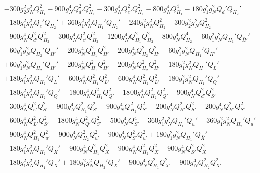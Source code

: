 {\begin{align}
 &-300 g_{2}^{2} g_{N}^{2} Q_{H_1}^{2} -900 g_{N}^{4} Q_{d'}^{2} Q_{H_1}^{2} -300 g_{N}^{4} Q_{e'}^{2} Q_{H_1}^{2} -800 g_{N}^{4} Q_{H_1}^{4} -180 g_{1}^{2} g_{N}^{2} Q_d' Q_{H_2}' \nonumber \\ 
 &-180 g_{1}^{2} g_{N}^{2} Q_e' Q_{H_2}' +360 g_{1}^{2} g_{N}^{2} Q_{H_1}' Q_{H_2}' -240 g_{1}^{2} g_{N}^{2} Q_{H_2}^{2} -300 g_{2}^{2} g_{N}^{2} Q_{H_2}^{2} \nonumber \\ 
 &-900 g_{N}^{4} Q_{d'}^{2} Q_{H_2}^{2} -300 g_{N}^{4} Q_{e'}^{2} Q_{H_2}^{2} -1200 g_{N}^{4} Q_{H_1}^{2} Q_{H_2}^{2} -800 g_{N}^{4} Q_{H_2}^{4} +60 g_{1}^{2} g_{N}^{2} Q_{H_1}' Q_{\bar{H}'}' \nonumber \\ 
 &-60 g_{1}^{2} g_{N}^{2} Q_{H_2}' Q_{\bar{H}'}' -200 g_{N}^{4} Q_{H_1}^{2} Q_{\bar{H}'}^{2} -200 g_{N}^{4} Q_{H_2}^{2} Q_{\bar{H}'}^{2} -60 g_{1}^{2} g_{N}^{2} Q_{H_1}' Q_{H'}' \nonumber \\ 
 &+60 g_{1}^{2} g_{N}^{2} Q_{H_2}' Q_{H'}' -200 g_{N}^{4} Q_{H_1}^{2} Q_{H'}^{2} -200 g_{N}^{4} Q_{H_2}^{2} Q_{H'}^{2} -180 g_{1}^{2} g_{N}^{2} Q_{H_1}' Q_L' \nonumber \\ 
 &+180 g_{1}^{2} g_{N}^{2} Q_{H_2}' Q_L' -600 g_{N}^{4} Q_{H_1}^{2} Q_{L'}^{2} -600 g_{N}^{4} Q_{H_2}^{2} Q_{L'}^{2} +180 g_{1}^{2} g_{N}^{2} Q_{H_1}' Q_Q' \nonumber \\ 
 &-180 g_{1}^{2} g_{N}^{2} Q_{H_2}' Q_Q' -1800 g_{N}^{4} Q_{H_1}^{2} Q_{Q'}^{2} -1800 g_{N}^{4} Q_{H_2}^{2} Q_{Q'}^{2} -900 g_{N}^{4} Q_{d'}^{2} Q_{S'}^{2} \nonumber \\ 
 &-300 g_{N}^{4} Q_{e'}^{2} Q_{S'}^{2} -900 g_{N}^{4} Q_{H_1}^{2} Q_{S'}^{2} -900 g_{N}^{4} Q_{H_2}^{2} Q_{S'}^{2} -200 g_{N}^{4} Q_{\bar{H}'}^{2} Q_{S'}^{2} -200 g_{N}^{4} Q_{H'}^{2} Q_{S'}^{2} \nonumber \\ 
 &-600 g_{N}^{4} Q_{L'}^{2} Q_{S'}^{2} -1800 g_{N}^{4} Q_{Q'}^{2} Q_{S'}^{2} -500 g_{N}^{4} Q_{S'}^{4} -360 g_{1}^{2} g_{N}^{2} Q_{H_1}' Q_u' +360 g_{1}^{2} g_{N}^{2} Q_{H_2}' Q_u' \nonumber \\ 
 &-900 g_{N}^{4} Q_{H_1}^{2} Q_{u'}^{2} -900 g_{N}^{4} Q_{H_2}^{2} Q_{u'}^{2} -900 g_{N}^{4} Q_{S'}^{2} Q_{u'}^{2} +180 g_{1}^{2} g_{N}^{2} Q_{H_1}' Q_{\bar{X}}' \nonumber \\ 
 &-180 g_{1}^{2} g_{N}^{2} Q_{H_2}' Q_{\bar{X}}' -900 g_{N}^{4} Q_{H_1}^{2} Q_{\bar{X}}^{2} -900 g_{N}^{4} Q_{H_2}^{2} Q_{\bar{X}}^{2} -900 g_{N}^{4} Q_{S'}^{2} Q_{\bar{X}}^{2} \nonumber \\ 
 &-180 g_{1}^{2} g_{N}^{2} Q_{H_1}' Q_X' +180 g_{1}^{2} g_{N}^{2} Q_{H_2}' Q_X' -900 g_{N}^{4} Q_{H_1}^{2} Q_{X'}^{2} -900 g_{N}^{4} Q_{H_2}^{2} Q_{X'}^{2} \nonumber \\ 

\end{align}}

